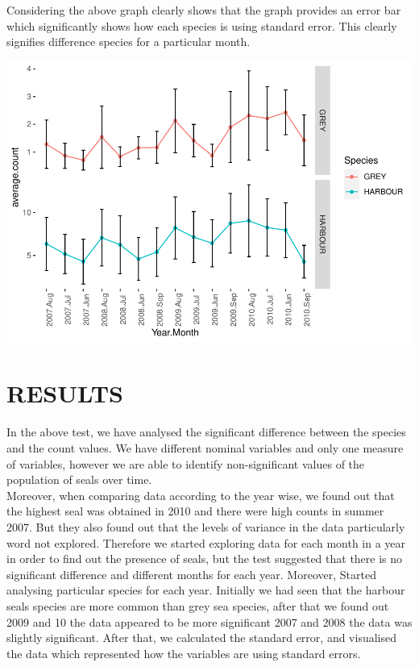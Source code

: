 \documentclass[
]{article}
\begin{document}
Considering the above graph clearly shows that the graph provides an
error bar which significantly shows how each species is using standard
error. This clearly signifies difference species for a particular month.

\includegraphics{Statistical-analysis-in-RStudio_files/figure-latex/unnamed-chunk-37-1.pdf}

\hypertarget{results}{%
\section{RESULTS}\label{results}}

In the above test, we have analysed the significant difference between
the species and the count values. We have different nominal variables
and only one measure of variables, however we are able to identify
non-significant values of the population of seals over time.\\
Moreover, when comparing data according to the year wise, we found out
that the highest seal was obtained in 2010 and there were high counts in
summer 2007. But they also found out that the levels of variance in the
data particularly word not explored. Therefore we started exploring data
for each month in a year in order to find out the presence of seals, but
the test suggested that there is no significant difference and different
months for each year. Moreover, Started analysing particular species for
each year. Initially we had seen that the harbour seals species are more
common than grey sea species, after that we found out 2009 and 10 the
data appeared to be more significant 2007 and 2008 the data was slightly
significant. After that, we calculated the standard error, and
visualised the data which represented how the variables are using
standard errors.
\end{document}
